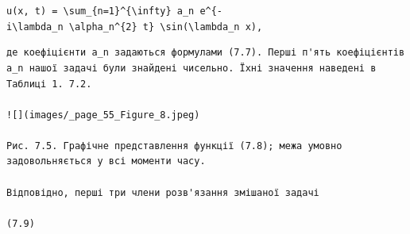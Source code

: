 \documentclass[
  ukrainian,
]{article}
\begin{document}
\texttt{u(x,\ t)\ =\ \textbackslash{}sum\_\{n=1\}\^{}\{\textbackslash{}infty\}\ a\_n\ e\^{}\{-i\textbackslash{}lambda\_n\ \textbackslash{}alpha\_n\^{}\{2\}\ t\}\ \textbackslash{}sin(\textbackslash{}lambda\_n\ x),}

\begin{verbatim}
де коефіцієнти a_n задаються формулами (7.7). Перші п'ять коефіцієнтів a_n нашої задачі були знайдені чисельно. Їхні значення наведені в Таблиці 1. 7.2.

![](images/_page_55_Figure_8.jpeg)

Рис. 7.5. Графічне представлення функції (7.8); межа умовно задовольняється у всі моменти часу.

Відповідно, перші три члени розв'язання змішаної задачі

(7.9)
\end{verbatim}
\end{document}

